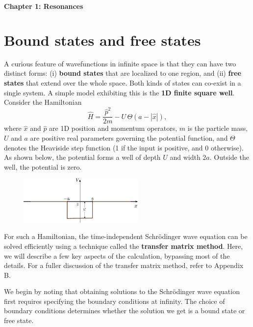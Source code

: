\documentclass[pra,12pt]{revtex4}
\begin{document}
\begin{center}
{\Large \textbf{Chapter 1: Resonances}}
\end{center}

\section{Bound states and free states}

A curious feature of wavefunctions in infinite space is that they can
have two distinct forms: (i) \textbf{bound states} that are localized
to one region, and (ii) \textbf{free states} that extend over the
whole space.  Both kinds of states can co-exist in a single system.  A
simple model exhibiting this is the \textbf{1D finite square well}.
Consider the Hamiltonian
\begin{equation}
  \hat{H} = \frac{\hat{p}^2}{2m} - U \,\Theta(a -|\hat{x}|),
\end{equation}
where $\hat{x}$ and $\hat{p}$ are 1D position and momentum operators,
$m$ is the particle mass, $U$ and $a$ are positive real parameters
governing the potential function, and $\Theta$ denotes the Heaviside
step function (1 if the input is positive, and 0 otherwise).  As shown
below, the potential forms a well of depth $U$ and width $2a$.
Outside the well, the potential is zero.

\begin{figure}[h]
  \centering\includegraphics[width=0.55\textwidth]{squarewell}
\end{figure}

For such a Hamiltonian, the time-independent Schr\"odinger wave
equation can be solved efficiently using a technique called the
\textbf{transfer matrix method}.  Here, we will describe a few key
aspects of the calculation, bypassing most of the details.  For a
fuller discussion of the transfer matrix method, refer to Appendix B.

We begin by noting that obtaining solutions to the Schr\"odinger wave
equation first requires specifying the boundary conditions at
infinity.  The choice of boundary conditions determines whether the
solution we get is a bound state or free state.
\end{document}

